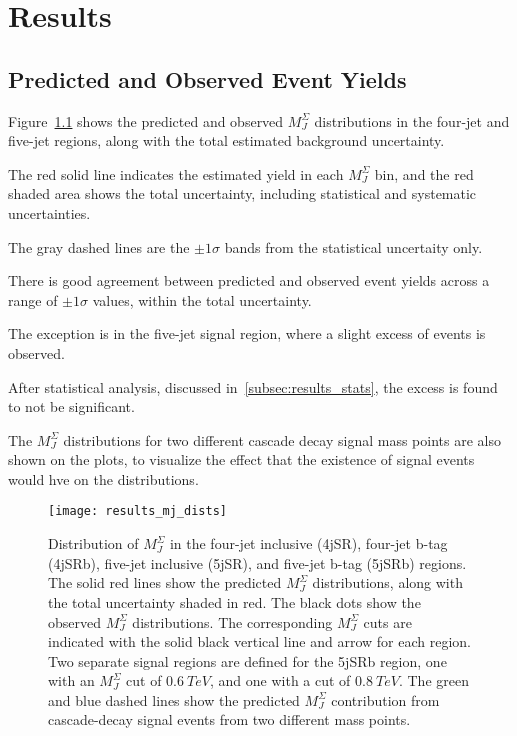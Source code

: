 \chapter{Results} \label{ch:results}

\section{Predicted and Observed Event Yields}\label{sec:results_yields}

Figure~\ref{fig:results_mj_dists} shows the predicted and observed $M_J^{\Sigma}$ distributions in the
four-jet and five-jet regions, along with the total estimated background uncertainty.

The red solid line indicates the estimated yield in each $M_J^{\Sigma}$ bin, and the red shaded area
shows the total uncertainty, including statistical and systematic uncertainties.

The gray dashed lines are the $\pm1\sigma$ bands from the statistical uncertaity only.

There is good agreement between predicted and observed event yields across a range of $\pm1\sigma$ values,
within the total uncertainty.

The exception is in the five-jet signal region, where a slight excess of events is observed.

After statistical analysis, discussed in~\ref{subsec:results_stats}, the excess is found to not be significant.

The $M_J^{\Sigma}$ distributions for two different cascade decay signal mass points are also shown on the plots,
to visualize the effect that the existence of signal events would hve on the distributions.


\begin{figure}[!ht]
    \centering
\texttt{[image: results\_mj\_dists]}
\caption{Distribution of $M_J^{\Sigma}$ in the four-jet inclusive (4jSR), four-jet b-tag (4jSRb), five-jet inclusive
(5jSR), and five-jet b-tag (5jSRb) regions.
The solid red lines show the predicted $M_J^{\Sigma}$ distributions, along with the total uncertainty shaded in red.
The black dots show the observed $M_J^{\Sigma}$ distributions.
The corresponding $M_J^{\Sigma}$ cuts are indicated with the solid black vertical line and arrow for each region.
Two separate signal regions are defined for the 5jSRb region, one with an $M_J^{\Sigma}$ cut of $0.6~TeV$,
and one with a cut of $0.8~TeV$.
The green and blue dashed lines show the predicted $M_J^{\Sigma}$ contribution from cascade-decay signal events
from two different mass points.
}
\label{fig:results_mj_dists}
\end{figure}

